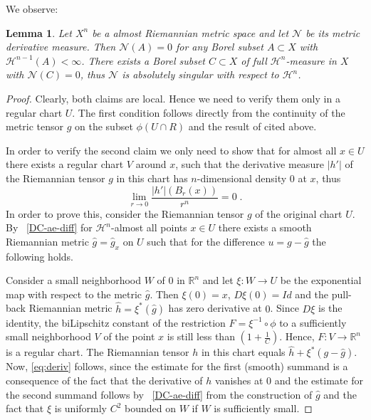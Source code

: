 \documentclass[12pt,leqno,intlimits]{amsart}
\numberwithin{equation}{section}
\newtheorem{lem}[thm]{Lemma}
\theoremstyle{definition}
\theoremstyle{remark}
\newcommand{\R}{\mathbb{R}}
\begin{document}
We observe:
\begin{lem}
Let $X^n$ be a almost Riemannian metric space and let $\mathcal N$ be its metric derivative measure.
Then $\mathcal N (A)=0$ for any Borel subset $A\subset X$ with $\mathcal H^{n-1} (A)<\infty$.
There exists a Borel subset $C\subset X$ of full $\mathcal H^n$-measure in $X$ with
$\mathcal N(C)=0$, thus $\mathcal N$ is absolutely singular with respect to $\mathcal H^n$.
\end{lem}


\begin{proof}
Clearly, both claims are local. Hence we need to verify them only in a regular chart $U$.  The first condition
follows directly from the continuity of the metric tensor $g$ on the subset $\phi(U\cap R)$ and the result of \cite{Goffmann}
cited above.

 In order to verify the second claim we only need to show   that for almost all $x\in U$ there exists a
 regular chart $V$
 around $x$, such that the derivative measure $|h'|$ of  the Riemannian tensor $g$ in this  chart has $n$-dimensional density $0$
 at $x$, thus
 \begin{equation} \label{eq:deriv}
 \lim _{r\to 0} \frac {|h'| (B_r (x))} {r^n} =0 \;.
 \end{equation}
 In order to prove this, consider the Riemannian tensor $g$ of the original chart $U$.  By ~\eqref{DC-ae-diff} for $\mathcal H^n$-almost all
 points $x\in U$ there exists a  smooth Riemannian metric $\hat g =\hat g_x$ on $U$ such that  for the difference
 $u=g-\hat g$  the following holds.

Consider a small neighborhood $W$ of $0$ in $\R^n$ and let $\xi :W\to U$ be the exponential map with respect to the metric
$\hat g$. Then $\xi (0)=x$, $D\xi  (0) =Id$  and  the  pull-back Riemannian metric $\hat h= \xi^{\ast}  (\hat g)$  has zero derivative at $0$.    Since $D\xi$ is the identity, the biLipschitz constant of the restriction $F=\xi ^{-1} \circ \phi$ to a sufficiently
small neighborhood $V$ of the point $x$ is still less than $(1 + \frac 1 C)$.      Hence, $F:V\to \R^n$ is a regular chart. The Riemannian tensor $h$ in this chart equals $\hat h  +\xi^{\ast } (g-\hat g)$.
Now, \eqref{eq:deriv} follows, since the estimate for the first (smooth) summand is a consequence of the fact that the derivative of $h$ vanishes at $0$ and  the estimate for the second summand follows by  ~\eqref{DC-ae-diff} from the construction of $\hat g$ and the fact that $\xi$ is uniformly $C^2$ bounded on $W$ if $W$ is sufficiently small.  
\end{proof}
\end{document}
